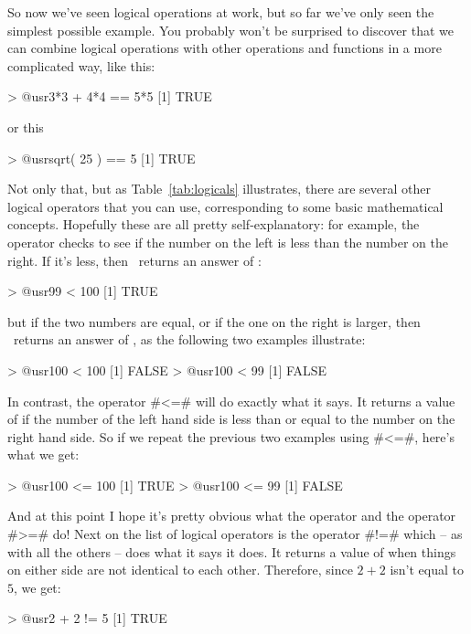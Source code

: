 So now we've seen logical operations at work, but so far we've only seen the simplest possible example. You probably won't be surprised to discover that we can combine logical operations with other operations and functions in a more complicated way, like this:
\begin{rblock1}
> @usr{3*3 + 4*4 == 5*5}
[1] TRUE
\end{rblock1} 
or this
\begin{rblock1}
> @usr{sqrt( 25 ) == 5}
[1] TRUE
\end{rblock1}
Not only that, but as Table~\ref{tab:logicals} illustrates, there are several other logical operators that you can use, corresponding to some basic mathematical concepts. Hopefully these are all pretty self-explanatory: for example, the  operator \rtext{<} checks to see if the number on the left is less than the number on the right. If it's less, then \R\ returns an answer of :
\begin{rblock1}
> @usr{99 < 100}
[1] TRUE
\end{rblock1}
but if the two numbers are equal, or if the one on the right is larger, then \R\ returns an answer of , as the following two examples illustrate:
\begin{rblock1}
> @usr{100 < 100}
[1] FALSE
> @usr{100 < 99}
[1] FALSE
\end{rblock1}
In contrast, the  operator \rtextverb#<=# will do exactly what it says. It returns a value of  if the number of the left hand side is less than or equal to the number on the right hand side. So if we repeat the previous two examples using \rtextverb#<=#, here's what we get: 
\begin{rblock1}
> @usr{100 <= 100}
[1] TRUE
> @usr{100 <= 99}
[1] FALSE
\end{rblock1}
And at this point I hope it's pretty obvious what the  operator \rtext{>} and the  operator \rtextverb#>=# do! Next on the list of logical operators is the  operator \rtextverb#!=# which -- as with all the others -- does what it says it does. It returns a value of  when things on either side are not identical to each other. Therefore, since $2+2$ isn't equal to $5$, we get:
\begin{rblock1}
> @usr{2 + 2 != 5}
[1] TRUE
\end{rblock1}


